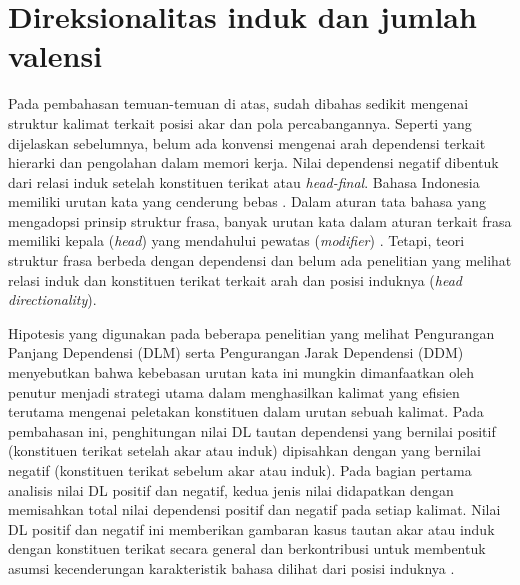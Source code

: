 \section{Direksionalitas induk dan jumlah valensi}
Pada pembahasan temuan-temuan di atas, sudah dibahas sedikit mengenai struktur kalimat terkait posisi akar dan pola percabangannya. Seperti yang dijelaskan sebelumnya, belum ada konvensi mengenai arah dependensi terkait hierarki dan pengolahan dalam memori kerja. Nilai dependensi negatif dibentuk dari relasi induk setelah konstituen terikat atau \textit{head-final}. Bahasa Indonesia memiliki urutan kata yang cenderung bebas \citep{sneddon2010indonesian}. Dalam aturan tata bahasa yang mengadopsi prinsip struktur frasa, banyak urutan kata dalam aturan terkait frasa memiliki kepala (\textit{head}) yang mendahului pewatas (\textit{modifier}) \citep{sneddon2010indonesian}. Tetapi, teori struktur frasa berbeda dengan dependensi dan belum ada penelitian yang melihat relasi induk dan konstituen terikat terkait arah dan posisi induknya (\textit{head directionality}). 

Hipotesis yang digunakan pada beberapa penelitian yang melihat Pengurangan Panjang Dependensi (DLM) \citep{futrell2015large} serta Pengurangan Jarak Dependensi (DDM) \citep{liu2017dependency} menyebutkan bahwa kebebasan urutan kata ini mungkin dimanfaatkan oleh penutur menjadi strategi utama dalam menghasilkan kalimat yang efisien terutama mengenai peletakan konstituen dalam urutan sebuah kalimat. Pada pembahasan ini, penghitungan nilai DL tautan dependensi yang bernilai positif (konstituen terikat setelah akar atau induk) dipisahkan dengan yang bernilai negatif (konstituen terikat sebelum akar atau induk). Pada bagian pertama analisis nilai DL positif dan negatif, kedua jenis nilai didapatkan dengan memisahkan total nilai dependensi positif dan negatif pada setiap kalimat. Nilai DL positif dan negatif ini memberikan gambaran kasus tautan akar atau induk dengan konstituen terikat secara general dan berkontribusi untuk membentuk asumsi kecenderungan karakteristik bahasa dilihat dari posisi induknya \citep{wang2017effects}. 

